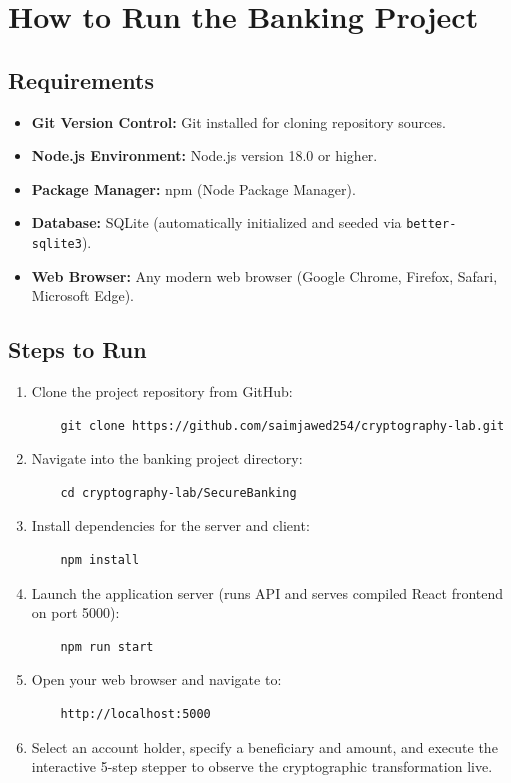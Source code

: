 \documentclass[11pt,a4paper]{article}
\begin{document}
\section{How to Run the Banking Project}

\subsection{Requirements}
\begin{itemize}
    \item \textbf{Git Version Control:} Git installed for cloning repository sources.
    \item \textbf{Node.js Environment:} Node.js version 18.0 or higher.
    \item \textbf{Package Manager:} npm (Node Package Manager).
    \item \textbf{Database:} SQLite (automatically initialized and seeded via \texttt{better-sqlite3}).
    \item \textbf{Web Browser:} Any modern web browser (Google Chrome, Firefox, Safari, Microsoft Edge).
\end{itemize}

\subsection{Steps to Run}
\begin{enumerate}
    \item Clone the project repository from GitHub:
    \begin{verbatim}
    git clone https://github.com/saimjawed254/cryptography-lab.git
    \end{verbatim}
    \item Navigate into the banking project directory:
    \begin{verbatim}
    cd cryptography-lab/SecureBanking
    \end{verbatim}
    \item Install dependencies for the server and client:
    \begin{verbatim}
    npm install
    \end{verbatim}
    \item Launch the application server (runs API and serves compiled React frontend on port 5000):
    \begin{verbatim}
    npm run start
    \end{verbatim}
    \item Open your web browser and navigate to:
    \begin{verbatim}
    http://localhost:5000
    \end{verbatim}
    \item Select an account holder, specify a beneficiary and amount, and execute the interactive 5-step stepper to observe the cryptographic transformation live.
\end{enumerate}
\end{document}
